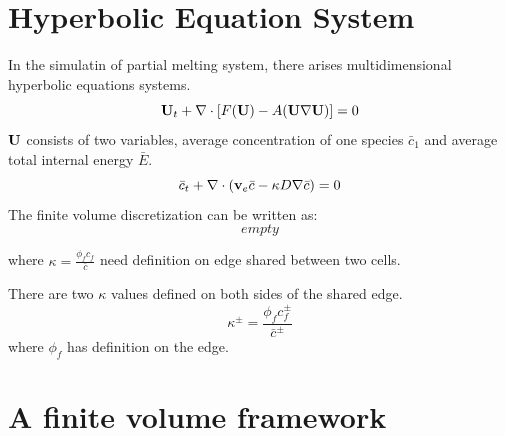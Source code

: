 \section{Hyperbolic Equation System}
In the simulatin of partial melting system, 
there arises multidimensional hyperbolic equations systems.
\begin{equation*}
		  \bold{U}_t + \nabla \cdot [F(\bold{U}) - A(\bold{U} \nabla \bold{U})] = 0
\end{equation*}
$\bold{U}$ consists of two variables, average concentration of one species $\bar{c}_1$ and 
average total internal energy $\bar{E}$.
\begin{equation*}
		  \bar{c}_t + \nabla \cdot (\bold{v}_e \bar{c} - \kappa D \nabla \bar{c}) = 0
\end{equation*}
The finite volume discretization can be written as:
$$empty$$

where $\kappa = \frac{\phi_f c_f}{\bar{c}}$ need definition on edge shared between two cells.
\begin{center}
\end{center}
There are two $\kappa$ values defined on both sides of the shared edge.
\begin{equation*}
		  \kappa^{\pm} = \frac{\phi_f c^{\pm}_f}{\bar{c}^{\pm}}
\end{equation*}
where $\phi_f$ has definition on the edge.

\section{A finite volume framework}


